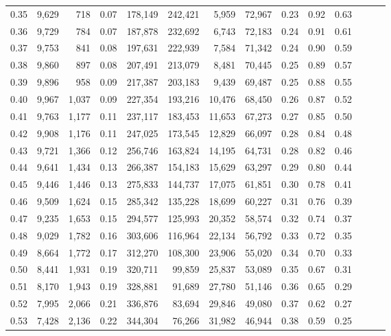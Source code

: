 \begin{tabular}{rrrrrrrrrrrrrr}
0.35 &  9,629 &    718 &  0.07 &  178,149 &  242,421 &   5,959 &  72,967 &  0.23 &  0.92 &      0.63 \\
0.36 &  9,729 &    784 &  0.07 &  187,878 &  232,692 &   6,743 &  72,183 &  0.24 &  0.91 &      0.61 \\
0.37 &  9,753 &    841 &  0.08 &  197,631 &  222,939 &   7,584 &  71,342 &  0.24 &  0.90 &      0.59 \\
0.38 &  9,860 &    897 &  0.08 &  207,491 &  213,079 &   8,481 &  70,445 &  0.25 &  0.89 &      0.57 \\
0.39 &  9,896 &    958 &  0.09 &  217,387 &  203,183 &   9,439 &  69,487 &  0.25 &  0.88 &      0.55 \\
0.40 &  9,967 &  1,037 &  0.09 &  227,354 &  193,216 &  10,476 &  68,450 &  0.26 &  0.87 &      0.52 \\
0.41 &  9,763 &  1,177 &  0.11 &  237,117 &  183,453 &  11,653 &  67,273 &  0.27 &  0.85 &      0.50 \\
0.42 &  9,908 &  1,176 &  0.11 &  247,025 &  173,545 &  12,829 &  66,097 &  0.28 &  0.84 &      0.48 \\
0.43 &  9,721 &  1,366 &  0.12 &  256,746 &  163,824 &  14,195 &  64,731 &  0.28 &  0.82 &      0.46 \\
0.44 &  9,641 &  1,434 &  0.13 &  266,387 &  154,183 &  15,629 &  63,297 &  0.29 &  0.80 &      0.44 \\
0.45 &  9,446 &  1,446 &  0.13 &  275,833 &  144,737 &  17,075 &  61,851 &  0.30 &  0.78 &      0.41 \\
0.46 &  9,509 &  1,624 &  0.15 &  285,342 &  135,228 &  18,699 &  60,227 &  0.31 &  0.76 &      0.39 \\
0.47 &  9,235 &  1,653 &  0.15 &  294,577 &  125,993 &  20,352 &  58,574 &  0.32 &  0.74 &      0.37 \\
0.48 &  9,029 &  1,782 &  0.16 &  303,606 &  116,964 &  22,134 &  56,792 &  0.33 &  0.72 &      0.35 \\
0.49 &  8,664 &  1,772 &  0.17 &  312,270 &  108,300 &  23,906 &  55,020 &  0.34 &  0.70 &      0.33 \\
0.50 &  8,441 &  1,931 &  0.19 &  320,711 &   99,859 &  25,837 &  53,089 &  0.35 &  0.67 &      0.31 \\
0.51 &  8,170 &  1,943 &  0.19 &  328,881 &   91,689 &  27,780 &  51,146 &  0.36 &  0.65 &      0.29 \\
0.52 &  7,995 &  2,066 &  0.21 &  336,876 &   83,694 &  29,846 &  49,080 &  0.37 &  0.62 &      0.27 \\
0.53 &  7,428 &  2,136 &  0.22 &  344,304 &   76,266 &  31,982 &  46,944 &  0.38 &  0.59 &      0.25 \\

\end{tabular}
